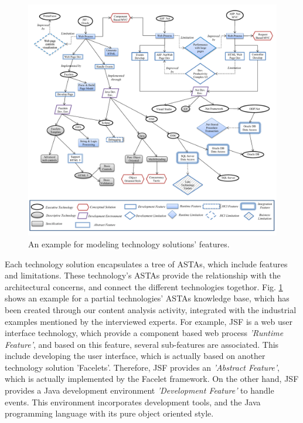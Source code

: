 \documentclass[conference]{IEEEtran}
\begin{document}
\begin{figure}
	\centering
		\includegraphics[scale=0.65]{TechnologyFeaturesExample.pdf}
	\caption{An example for modeling technology solutions' features.}
	\label{fig:TechnologyAspectsStructureExample}
\end{figure}

Each technology solution encapsulates a tree of ASTAs, which include features
and limitations. These technology's ASTAs provide the relationship with the
architectural concerns, and connect the different technologies togethor. Fig.
\ref{fig:TechnologyAspectsStructureExample} shows an example for a partial
technologies' ASTAs knowledge base, which has been created through our content
analysis activity, integrated with the industrial examples mentioned by the
interviewed experts. For example, JSF is a web user interface technology, which
provide a component based web process \textit{'Runtime Feature'}, and based on
this feature, several sub-features are associated. This include developing the user
interface, which is actually based on another technology solution 'Facelets'.
Therefore, JSF provides an \textit{'Abstract Feature'}, which is actually
implemented by the Facelet framework. On the other hand, JSF provides a Java development
environment \textit{'Development Feature'} to handle events. This environment
incorporates development tools, and the Java programming
language with its pure object oriented style.
\end{document}

